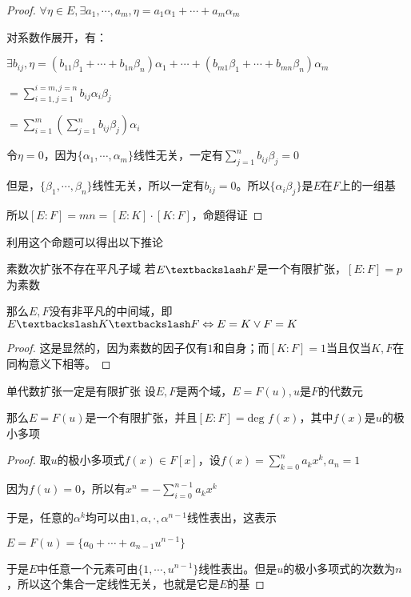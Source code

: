 \documentclass[12pt, a4paper, oneside, UTF8]{ctexbook}
\begin{document}
\begin{para}{0}
\begin{proof}
						$\forall \eta \in E,\exists a_1,\cdots,a_m,\eta =a_1 \alpha_1+\cdots+a_m \alpha_m$

						对系数作展开，有：

						$\exists b_{ij},\eta =(b_{11}\beta_1+\cdots+b_{1n}\beta_n) \alpha_1+\cdots+(b_{m1}\beta_1+\cdots+b_{mn}\beta_n) \alpha_m$

						$=\sum\limits_{i=1,j=1}^{i=m,j=n} b_{ij}\alpha_i \beta_j$

						$=\sum\limits_{i=1}^{m}\left(\sum\limits_{j=1}^{n}b_{ij} \beta_j\right) \alpha_i$

						令$\eta =0$，因为$\{\alpha_1,\cdots,\alpha_m\}$线性无关，一定有$\sum\limits_{j=1}^{n}b_{ij} \beta_j=0$

						但是，$\{\beta_1,\cdots,\beta_n\}$线性无关，所以一定有$b_{ij}=0$。所以$\{\alpha_i \beta_j\}$是$E$在$F$上的一组基

						所以$[E:F]=mn=[E:K]\cdot [K:F]$，命题得证
					\end{proof}
					利用这个命题可以得出以下推论
					\begin{corollary}{素数次扩张不存在平凡子域}{}
						若$E \textbackslash F$是一个有限扩张，$[E:F]=p$为素数

						那么$E,F$没有非平凡的中间域，即$E\textbackslash K\textbackslash F \Leftrightarrow E=K \vee  F=K$
					\end{corollary}
					\begin{proof}
						这是显然的，因为素数的因子仅有$1$和自身；而$[K:F]=1$当且仅当$K,F$在同构意义下相等。
					\end{proof}
					\begin{corollary}{单代数扩张一定是有限扩张}{}
						设$E,F$是两个域，$E=F(u),u$是$F$的代数元
						
						那么$E=F(u)$是一个有限扩张，并且$[E:F]=\text{deg }f(x)$，其中$f(x)$是$u$的极小多项
					\end{corollary}
					\begin{proof}
						取$u$的极小多项式$f(x) \in F[x]$，设$f(x)=\sum\limits_{k=0}^{n} a_k x^k,a_n =1$

						因为$f(u)=0$，所以有$x^n = -\sum\limits_{i=0}^{n-1} a_k x^k$

						于是，任意的$\alpha ^k$均可以由$1,\alpha,\cdot,\alpha^{n-1}$线性表出，这表示

						$E = F(u)=\{a_0 +\cdots+a_{n-1} u^{n-1}\}$

						于是$E$中任意一个元素可由$\{1,\cdots,u^{n-1}\}$线性表出。但是$u$的极小多项式的次数为$n$，所以这个集合一定线性无关，也就是它是$E$的基


\end{proof}
\end{para}
\end{document}
